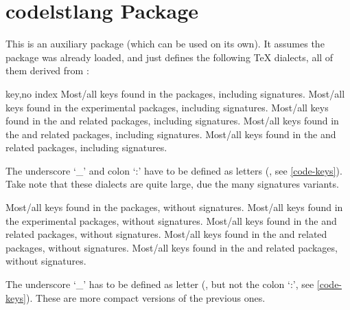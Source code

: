 \documentclass{article}
\begin{document}
\newpage
\section{codelstlang Package}\label{lstlang.pack}
This is an auxiliary package (which can be used on its own). It assumes the package  was already loaded, and just defines the following \TeX{} dialects, all of them derived from  :
\begin{describelist}{key,no index}
   {Most/all  keys found in the \cite{l3kernel} packages, including signatures. }
   {Most/all  keys found in the  experimental packages, including signatures. }
   {Most/all  keys found in the  and related packages, including signatures. }
   {Most/all  keys found in the  and related packages, including signatures. }
   {Most/all  keys found in the  and related packages, including signatures.}
\begin{tsremark}
  The underscore `\_' and colon `:' have to be defined as letters (, see \ref{code-keys}). Take note that these dialects are quite large, due the many signatures variants.
\end{tsremark}  
   {Most/all  keys found in the  packages, without signatures. }
   {Most/all  keys found in the  experimental packages, without signatures. }
   {Most/all  keys found in the  and related packages, without signatures. }
   {Most/all  keys found in the  and related packages, without signatures. }
   {Most/all  keys found in the  and related packages, without signatures.}
\begin{tsremark}
  The underscore `\_' has  to be defined as letter (, but not the colon `:', see \ref{code-keys}). These are more compact versions of the previous ones.
\end{tsremark}  

\end{describelist}
\end{document}
